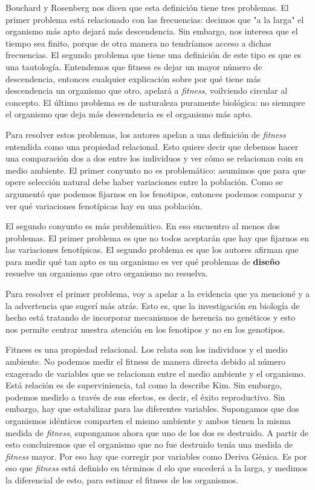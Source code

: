 Bouchard y Rosenberg \cite{Bouchard2004} nos dicen que esta definición tiene tres problemas. El primer problema está relacionado con las frecuencias: decimos que "a la larga" el organismo más apto dejará más descendencia. Sin embargo, nos interesa que el tiempo sea finito, porque de otra manera no tendríamos acceso a dichas frecuencias. El segundo problema que tiene una definición de este tipo es que es una tautología. Entendemos que fitness es dejar un mayor número de descendencia, entonces cualquier explicación sobre por qué tiene más descendencia un organismo que otro, apelará a \emph{fitness}, voilviendo circular al concepto. El último problema es de naturaleza puramente biológica: no siemnpre el organismo que deja más descendencia es el organismo más apto.

Para resolver estos problemas, los autores apelan a una definición de \emph{fitness} entendida como una propiedad relacional. Esto quiere decir que debemos hacer una comparación dos a dos entre los individuos y ver cómo se relacionan coin su medio ambiente. El primer conyunto no es problemático: asumimos que para que opere selección natural debe haber variaciones entre la población. Como se argumentó que podemos fijarnos en los fenotipos, entonces podemos comparar y ver qué variaciones fenotípicas hay en una población.

El segundo conyunto es más problemático. En eso encuentro al menos dos problemas. El primer problema es que no todos aceptarán que hay que fijarnos en las variaciones fenotípicas. El segundo problema es que los autores afirman que para medir qué tan apto es un organismo es ver qué problemas de \textbf{diseño} resuelve un organismo que otro organismo no resuelva.

Para resolver el primer problema, voy a apelar a la evidencia que ya mencioné y a la advertencia que sugerí más atrás. Esto es, que la investigación en biología de hecho está tratando de incorporar mecanismos de herencia no genéticos y esto nos permite centrar nuestra atención en los fenotipos y no en los genotipos. 

Fitness es una propiedad relacional. Los relata son los individuos y el medio ambiente. No podemos medir el fitness de manera directa debido al número exagerado de variables que se relacionan entre el medio ambiente y el organismo. Está relación es de superviniencia, tal como la describe Kim. Sin embargo, podemos medirlo a través de sus efectos, es decir, el éxito reproductivo. Sin embargo, hay que estabilizar para las diferentes variables. Supongamos que dos organismos idénticos comparten el mismo ambiente y ambos tienen la misma medida de \emph{fitness}, supongamos ahora que uno de los dos es destruido. A partir de esto concluiremos que el organismo que no fue destruido tenía una medida de \emph{fitness} mayor. Por eso hay que corregir por variables como Deriva Génica. Es por eso que \emph{fitness} está definido en términos d elo que sucederá a la larga, y medimos la diferencial de esto, para estimar el fitness de los organismos.

